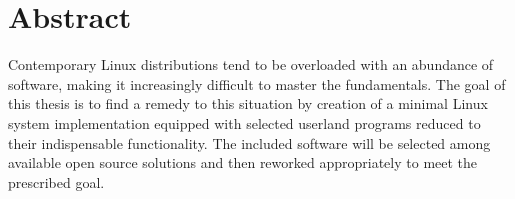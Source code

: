\section*{Abstract}\label{Abstract}
Contemporary Linux distributions tend to be overloaded with an abundance of software, making it increasingly difficult to master the fundamentals.
The goal of this thesis is to find a remedy to this situation by creation of a minimal Linux system implementation equipped with selected userland programs reduced to their indispensable functionality. The included software will be selected among available open source solutions and then reworked appropriately to meet the prescribed goal.

